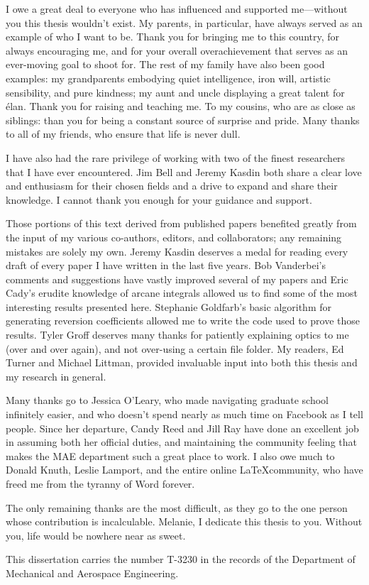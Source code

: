 I owe a great deal to everyone who has influenced and supported me---without you this thesis wouldn't exist.  My parents, in particular, have always served as an example of who I want to be.  Thank you for bringing me to this country, for always encouraging me, and for your overall overachievement that serves as an ever-moving goal to shoot for.  The rest of my family have also been good examples: my grandparents embodying quiet intelligence, iron will, artistic sensibility, and pure kindness; my aunt and uncle displaying a great talent for \'{e}lan. Thank you for raising and teaching me.  To my cousins, who are as close as siblings: than you for being a constant source of surprise and pride.   Many thanks to all of my friends, who ensure that life is never dull.

I have also had the rare privilege of working with two of the finest researchers that I have ever encountered.  Jim Bell and Jeremy Kasdin both share a clear love and enthusiasm for their chosen fields and a drive to expand and share their knowledge.  I cannot thank you enough for your guidance and support.  

Those portions of this text derived from published papers benefited greatly from the input of my various co-authors, editors, and collaborators; any remaining mistakes are solely my own.  Jeremy Kasdin deserves a medal for reading every draft of every paper I have written in the last five years.  Bob Vanderbei's  comments and suggestions have vastly improved several of my papers and Eric Cady's erudite knowledge of arcane integrals allowed us to find some of the most interesting results presented here.  Stephanie Goldfarb's basic algorithm for generating reversion coefficients allowed me to write the code used to prove those results.  Tyler Groff deserves many thanks for patiently explaining optics to me (over and over again), and not over-using a certain file folder.  My readers, Ed Turner and Michael Littman, provided invaluable input into both this thesis and my research in general.

Many thanks go to Jessica O'Leary, who made navigating graduate school infinitely easier, and who doesn't spend nearly as much time on Facebook as I tell people.  Since her departure, Candy Reed and Jill Ray have done an excellent job in assuming both her official duties, and maintaining the community feeling that makes the MAE department such a great place to work.  I also owe much to Donald Knuth, Leslie Lamport, and the entire online \LaTeX community, who have freed me from the tyranny of Word forever.

The only remaining thanks are the most difficult, as they go to the one person whose contribution is incalculable.  Melanie, I dedicate this thesis to you.  Without you, life would be nowhere near as sweet.

\vfill
\noindent This dissertation carries the number T-3230 in the records of the Department of Mechanical and Aerospace Engineering.